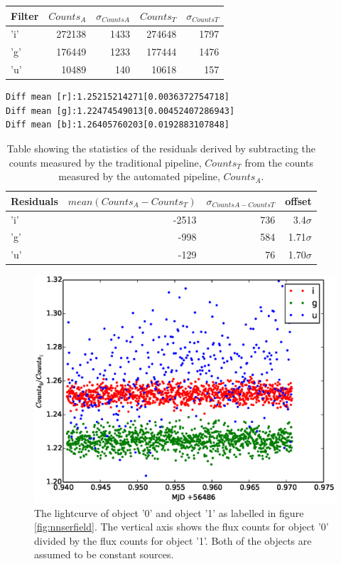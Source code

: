 \begin{center}
	\begin{tabular}{|l|r|r|r|r|}
		\hline
		Filter & $Counts_{A}$ & $\sigma_{Counts A}$ & $Counts_{T}$ & $\sigma_{Counts T}$\\
		\hline
		'i' & 272138 & 1433 &  274648 & 1797\\
		'g' & 176449 & 1233 & 177444  & 1476\\
		'u' & 10489 & 140 & 10618 & 157 \\
		\hline
	\end{tabular}
\end{center}
\begin{verbatim}
Diff mean [r]:1.25215214271[0.0036372754718]
Diff mean [g]:1.22474549013[0.00452407286943]
Diff mean [b]:1.26405760203[0.0192883107848]
\end{verbatim}

\begin{table}[ht]
  \label{table:residuals}
  \caption{Table showing the statistics of the residuals derived by subtracting the counts measured by the traditional pipeline, $Counts_{T}$ from the counts measured by the automated pipeline, $Counts_{A}$.}
  \centering
  \begin{tabular}{|l|r|r|r|}
    \hline
    Residuals & $mean(Counts_{A}-Counts_{T})$ & $\sigma_{CountsA - CountsT}$ & offset\\
    \hline
    'i' & -2513 & 736 & 3.4$\sigma$\\
    'g' & -998 & 584 & 1.71$\sigma$\\
    'u' & -129 & 76 & 1.70$\sigma$\\
    \hline
   \end{tabular}
\end{table}

\begin{figure}[!h]
\centering
\includegraphics[width=140mm]{images/differential_auto.eps}
\caption{The lightcurve of object '0' and object '1' as labelled in figure \ref{fig:nnserfield}. The vertical axis shows the flux counts for object '0' divided by the flux counts for object '1'. Both of the objects are assumed to be constant sources. }
\label{fig:differentialauto}
\end{figure}


